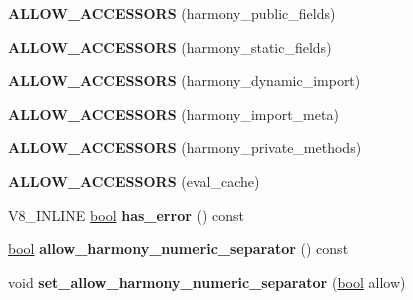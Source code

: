 \begin{DoxyCompactItemize}
{\bfseries A\+L\+L\+O\+W\+\_\+\+A\+C\+C\+E\+S\+S\+O\+RS} (harmony\+\_\+public\+\_\+fields)
\item 
\mbox{\label{classv8_1_1internal_1_1ParserBase_a8fd8a4996d44d7f5cca62301faa7eb21}} 
{\bfseries A\+L\+L\+O\+W\+\_\+\+A\+C\+C\+E\+S\+S\+O\+RS} (harmony\+\_\+static\+\_\+fields)
\item 
\mbox{\label{classv8_1_1internal_1_1ParserBase_a16de5e1a3710712081ad5c4462ea3964}} 
{\bfseries A\+L\+L\+O\+W\+\_\+\+A\+C\+C\+E\+S\+S\+O\+RS} (harmony\+\_\+dynamic\+\_\+import)
\item 
\mbox{\label{classv8_1_1internal_1_1ParserBase_a4b1da1bdaf6661b1662a5bb3b705ba1d}} 
{\bfseries A\+L\+L\+O\+W\+\_\+\+A\+C\+C\+E\+S\+S\+O\+RS} (harmony\+\_\+import\+\_\+meta)
\item 
\mbox{\label{classv8_1_1internal_1_1ParserBase_a7b4bfc5ec425b74d1e4d66ee00a85d84}} 
{\bfseries A\+L\+L\+O\+W\+\_\+\+A\+C\+C\+E\+S\+S\+O\+RS} (harmony\+\_\+private\+\_\+methods)
\item 
\mbox{\label{classv8_1_1internal_1_1ParserBase_aa1cb75f9b8fa1bcbe507f1d32f511c79}} 
{\bfseries A\+L\+L\+O\+W\+\_\+\+A\+C\+C\+E\+S\+S\+O\+RS} (eval\+\_\+cache)
\item 
\mbox{\label{classv8_1_1internal_1_1ParserBase_ac7e785039c9daa294b67db8bc5d62894}} 
V8\+\_\+\+I\+N\+L\+I\+NE \mbox{\hyperlink{classbool}{bool}} {\bfseries has\+\_\+error} () const
\item 
\mbox{\label{classv8_1_1internal_1_1ParserBase_aa61f20684bf78ecea9a365c015224be5}} 
\mbox{\hyperlink{classbool}{bool}} {\bfseries allow\+\_\+harmony\+\_\+numeric\+\_\+separator} () const
\item 
\mbox{\label{classv8_1_1internal_1_1ParserBase_af72b1516cd4ddf17aeb2a761be2b6d8e}} 
void {\bfseries set\+\_\+allow\+\_\+harmony\+\_\+numeric\+\_\+separator} (\mbox{\hyperlink{classbool}{bool}} allow)
\item 
\mbox{\label{classv8_1_1internal_1_1ParserBase_ad301758aa59abad46970eb1db1e6b03d}} 

\end{DoxyCompactItemize}
